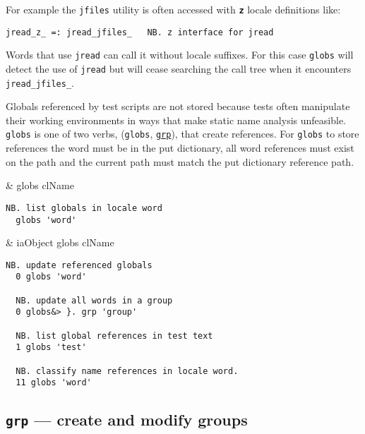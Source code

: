 For example the \texttt{jfiles} utility is often 
accessed with \textbf{\texttt{z}} locale definitions like: 

\begin{lstlisting}[frame=single,framerule=0pt] 
   jread_z_ =: jread_jfiles_   NB. z interface for jread
\end{lstlisting}

Words that use \texttt{jread} can call it without locale suffixes. 
For this case \texttt{globs} will detect the use of \texttt{jread} but will 
cease searching the call tree when it encounters \verb|jread_jfiles_|.

Globals referenced by test scripts are not stored because tests 
often manipulate their working environments in ways that make 
static name analysis unfeasible. \texttt{globs} is one of two verbs, 
(\texttt{globs}, \hyperlink{il:grp}{\texttt{grp}}), that create references. 
For \texttt{globs} to store 
references the word must be in the put dictionary, all 
word references must exist on the path and the current 
path must match the put dictionary reference path. 

\begin{wordhead}
\monad & globs clName \\
\end{wordhead}
\begin{lstlisting}[frame=single,framerule=0pt] 
  NB. list globals in locale word 
  globs 'word' 
\end{lstlisting}

\begin{wordhead}
\dyad & iaObject globs clName \\
\end{wordhead}
\begin{lstlisting}[frame=single,framerule=0pt] 
  NB. update referenced globals
  0 globs 'word' 

  NB. update all words in a group
  0 globs&> }. grp 'group' 

  NB. list global references in test text
  1 globs 'test'           

  NB. classify name references in locale word. 
  11 globs 'word'  
\end{lstlisting}


\subsection{\texttt{grp} --- create and modify groups}\label{ss:grp}

